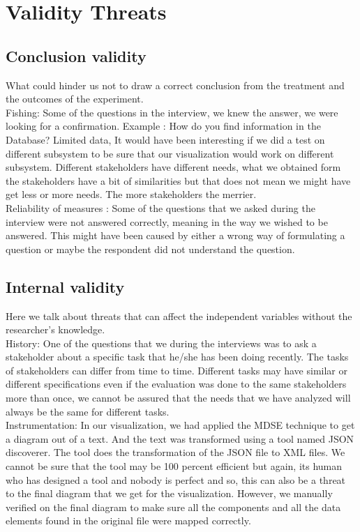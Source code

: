 
\chapter{Validity Threats}

\section{Conclusion validity}
What could hinder us not to draw a correct conclusion from the treatment and the outcomes of the experiment.\\

Fishing: Some of the questions in the interview, we knew the answer, we were looking for a confirmation. Example : How do you find information in the Database?
Limited data, It would have been interesting if we did a test on different subsystem to be sure that our visualization would work on different subsystem.
Different stakeholders have different needs, what we obtained form the  stakeholders have a bit of similarities but that does not mean we might have get less or more needs. The more stakeholders the merrier.\\

Reliability of measures : Some of the questions that we asked during the interview were not answered correctly, meaning in the way we wished to be answered. This might have been caused by either a wrong way of formulating  a question or maybe the respondent did not understand the question.


\section{Internal validity}
Here we talk about threats that can affect the independent variables without the researcher’s knowledge.\\

History: One of the questions that we during the interviews was to ask a stakeholder about a specific task that he/she has been doing recently. The tasks of stakeholders can differ from time to time. Different tasks may have similar or different specifications even if the evaluation was done to the same stakeholders more than once, we cannot be assured that the needs that we have analyzed will always be the same for different tasks.\\

Instrumentation: In our visualization, we had applied the MDSE technique to get a diagram out of a text. And the text was transformed using a tool named JSON discoverer. The tool does the transformation of the JSON file to XML files. We cannot be sure that the tool may be 100 percent efficient but again, its human who has designed a tool and nobody is perfect and so, this can also be a threat to the final diagram that we get for the visualization. However, we manually verified on the final diagram to make sure all the components and all the data elements found in the original file were mapped correctly.\\

